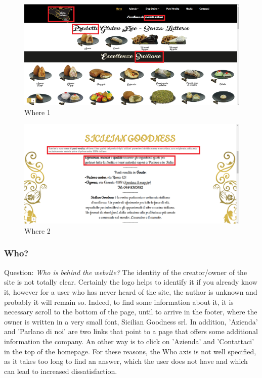 \begin{figure}[H]
	\centering\includegraphics[width=12cm]{Img/where1.png}
	\caption{Where 1}
\end{figure}

\begin{figure}[H]
	\centering\includegraphics[width=12cm]{Img/where2.png}
	\caption{Where 2}
\end{figure}

\pagebreak

\subsubsection{Who?}

Question: \textit{Who is behind the website?}
\newline
The identity of the creator/owner of the site is not totally clear. Certainly the logo helps to identify it if you already know it, however for a user who has never heard of the site, the author is unknown and probably it will remain so. Indeed, to find some information about it, it is necessary scroll to the bottom of the page, until
to arrive in the footer, where the owner is written in a very small font, Sicilian Goodness srl. In addition, 'Azienda' and 'Parlano di noi' are two links that point to a page that offers some additional information the company.
An other way is to click on 'Azienda' and 'Contattaci' in the top of the homepage. For these reasons, the Who axis is not well specified, as it takes too long to find an answer, which the user does not have and which can lead to increased dissatisfaction.

